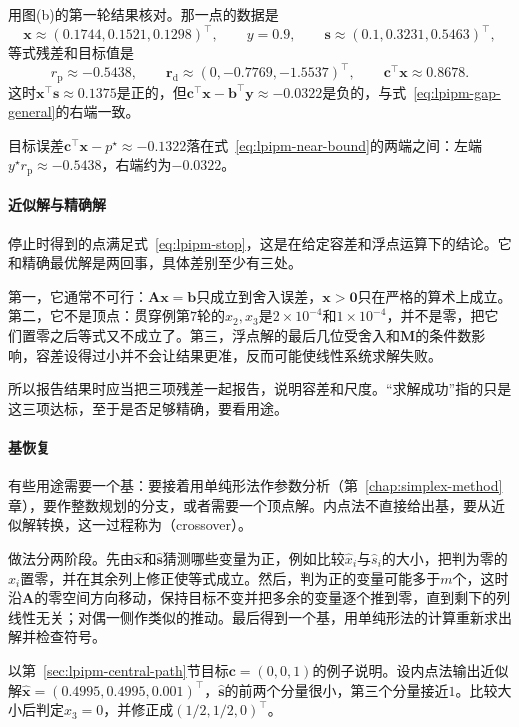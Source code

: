 用图(b)的第一轮结果核对。那一点的数据是
\[
 \bm{x}\approx(0.1744,0.1521,0.1298)^\top,\qquad y=0.9,\qquad\bm{s}\approx(0.1,0.3231,0.5463)^\top,
\]
等式残差和目标值是
\[
 r_{\mathrm{p}}\approx-0.5438,\qquad\bm{r}_{\mathrm{d}}\approx(0,-0.7769,-1.5537)^\top,\qquad\bm{c}^\top\bm{x}\approx0.8678.
\]
这时$\bm{x}^\top\bm{s}\approx0.1375$是正的，但$\bm{c}^\top\bm{x}-\bm{b}^\top\bm{y}\approx-0.0322$是负的，与式~\eqref{eq:lpipm-gap-general}的右端一致。

目标误差$\bm{c}^\top\bm{x}-p^\star\approx-0.1322$落在式~\eqref{eq:lpipm-near-bound}的两端之间：左端$y^\star r_{\mathrm{p}}\approx-0.5438$，右端约为$-0.0322$。

\paragraph{近似解与精确解}
停止时得到的点满足式~\eqref{eq:lpipm-stop}，这是在给定容差和浮点运算下的结论。它和精确最优解是两回事，具体差别至少有三处。

第一，它通常不可行：$\bm{A}\bm{x}=\bm{b}$只成立到舍入误差，$\bm{x}>\bm{0}$只在严格的算术上成立。第二，它不是顶点：贯穿例第$7$轮的$x_2,x_3$是$2\times10^{-4}$和$1\times10^{-4}$，并不是零，把它们置零之后等式又不成立了。第三，浮点解的最后几位受舍入和$\bm{M}$的条件数影响，容差设得过小并不会让结果更准，反而可能使线性系统求解失败。

所以报告结果时应当把三项残差一起报告，说明容差和尺度。“求解成功”指的只是这三项达标，至于是否足够精确，要看用途。

\paragraph{基恢复}
有些用途需要一个基：要接着用单纯形法作参数分析（第~\ref{chap:simplex-method}章），要作整数规划的分支，或者需要一个顶点解。内点法不直接给出基，要从近似解转换，这一过程称为（crossover）。

做法分两阶段。先由$\hat{\bm{x}}$和$\hat{\bm{s}}$猜测哪些变量为正，例如比较$\hat{x}_i$与$\hat{s}_i$的大小，把判为零的$x_i$置零，并在其余列上修正使等式成立。然后，判为正的变量可能多于$m$个，这时沿$\bm{A}$的零空间方向移动，保持目标不变并把多余的变量逐个推到零，直到剩下的列线性无关；对偶一侧作类似的推动。最后得到一个基，用单纯形法的计算重新求出解并检查符号。

以第~\ref{sec:lpipm-central-path}节目标$\bm{c}=(0,0,1)$的例子说明。设内点法输出近似解$\hat{\bm{x}}=(0.4995,0.4995,0.001)^\top$，$\hat{\bm{s}}$的前两个分量很小，第三个分量接近$1$。比较大小后判定$x_3=0$，并修正成$(1/2,1/2,0)^\top$。

